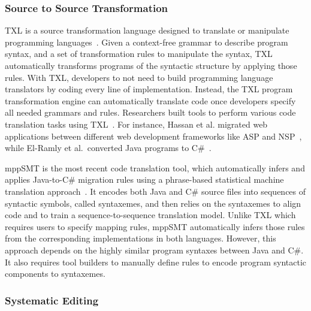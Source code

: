 \documentclass[runningheads,a4paper]{llncs}
\begin{document}
\subsubsection{Source to Source Transformation} 


TXL is a source transformation language designed to translate or manipulate programming languages~\cite{Cordy2006}. Given a context-free grammar to describe program syntax, and a set of transformation rules to manipulate the syntax, TXL automatically transforms programs of the syntactic structure by applying those rules. With TXL, developers to not need to build programming language translators by coding every line of implementation. Instead, the TXL program transformation engine can automatically translate code once developers specify all needed grammars and rules. Researchers built tools to perform various code translation tasks using TXL~\cite{Chu:08,Hassan:2005,El-Ramly:2006,Tonella:04}. For instance, Hassan et al. migrated web applications between different web development frameworks like ASP and NSP~\cite{Hassan:2005}, while El-Ramly et al.~converted Java programs to C\#~\cite{El-Ramly:2006}. 


mppSMT is the most recent code translation tool, which automatically infers and applies Java-to-C\# migration rules using a phrase-based statistical machine translation approach~\cite{Nguyen:15}. It encodes both Java and C\# source files into sequences of syntactic symbols, called syntaxemes, and then relies on the syntaxemes to align code and to train a sequence-to-sequence translation model. 
Unlike TXL which requires users to specify mapping rules, mppSMT automatically infers those rules from the corresponding implementations in both languages. 
However, this approach depends on the highly similar program syntaxes between Java and C\#. It also requires tool builders to manually define rules to encode program syntactic components to syntaxemes. 

\subsubsection{Systematic Editing}
\label{sec:sysedit}

\end{document}

